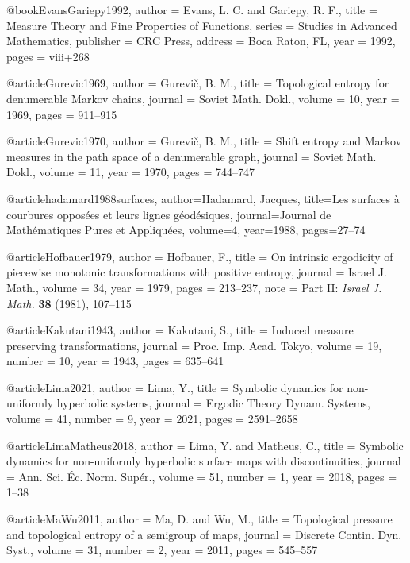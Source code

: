 @book{EvansGariepy1992,
  author = {Evans, L. C. and Gariepy, R. F.},
  title = {Measure Theory and Fine Properties of Functions},
  series = {Studies in Advanced Mathematics},
  publisher = {CRC Press},
  address = {Boca Raton, FL},
  year = {1992},
  pages = {viii+268}
}

@article{Gurevic1969,
  author = {Gurevič, B. M.},
  title = {Topological entropy for denumerable Markov chains},
  journal = {Soviet Math. Dokl.},
  volume = {10},
  year = {1969},
  pages = {911--915}
}

@article{Gurevic1970,
  author = {Gurevič, B. M.},
  title = {Shift entropy and Markov measures in the path space of a denumerable graph},
  journal = {Soviet Math. Dokl.},
  volume = {11},
  year = {1970},
  pages = {744--747}
}

@article{hadamard1988surfaces,
  author={Hadamard, Jacques},
  title={Les surfaces {\`a} courbures oppos{\'e}es et leurs lignes g{\'e}od{\'e}siques},
  journal={Journal de Mathématiques Pures et Appliquées},
  volume={4},
  year={1988},
  pages={27--74}
}

@article{Hofbauer1979,
  author = {Hofbauer, F.},
  title = {On intrinsic ergodicity of piecewise monotonic transformations with positive entropy},
  journal = {Israel J. Math.},
  volume = {34},
  year = {1979},
  pages = {213--237},
  note = {Part II: \emph{Israel J. Math.} \textbf{38} (1981), 107--115}
}

@article{Kakutani1943,
  author = {Kakutani, S.},
  title = {Induced measure preserving transformations},
  journal = {Proc. Imp. Acad. Tokyo},
  volume = {19},
  number = {10},
  year = {1943},
  pages = {635--641}
}

@article{Lima2021,
  author = {Lima, Y.},
  title = {Symbolic dynamics for non-uniformly hyperbolic systems},
  journal = {Ergodic Theory Dynam. Systems},
  volume = {41},
  number = {9},
  year = {2021},
  pages = {2591--2658}
}

@article{LimaMatheus2018,
  author = {Lima, Y. and Matheus, C.},
  title = {Symbolic dynamics for non-uniformly hyperbolic surface maps with discontinuities},
  journal = {Ann. Sci. Éc. Norm. Supér.},
  volume = {51},
  number = {1},
  year = {2018},
  pages = {1--38}
}

@article{MaWu2011,
  author = {Ma, D. and Wu, M.},
  title = {Topological pressure and topological entropy of a semigroup of maps},
  journal = {Discrete Contin. Dyn. Syst.},
  volume = {31},
  number = {2},
  year = {2011},
  pages = {545--557}
}

